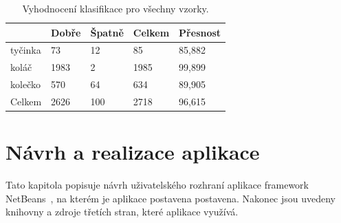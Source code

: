 \documentclass[11pt,twoside,a4paper,table]{book}
\begin{document}
\begin{table}[h]
\begin{center}
\begin{tabular}{lllll}
\rowcolor[HTML]{9B9B9B} 
\multicolumn{1}{|l|}{\cellcolor[HTML]{9B9B9B}Třída} & \multicolumn{1}{l|}{\cellcolor[HTML]{9B9B9B}Dobře} & \multicolumn{1}{l|}{\cellcolor[HTML]{9B9B9B}Špatně}  & \multicolumn{1}{l|}{\cellcolor[HTML]{9B9B9B}Celkem} & \multicolumn{1}{l|}{\cellcolor[HTML]{9B9B9B}Přesnost} \\ \hline
\multicolumn{1}{|l|}{tyčinka}                             & \multicolumn{1}{l|}{73}                            & \multicolumn{1}{l|}{12}                              & \multicolumn{1}{l|}{85}                             & \multicolumn{1}{l|}{85,882}                           \\ \hline
\multicolumn{1}{|l|}{koláč}                             & \multicolumn{1}{l|}{1983}                          & \multicolumn{1}{l|}{2}                               & \multicolumn{1}{l|}{1985}                           & \multicolumn{1}{l|}{99,899}                           \\ \hline
\multicolumn{1}{|l|}{kolečko}                             & \multicolumn{1}{l|}{570}                           & \multicolumn{1}{l|}{64}                              & \multicolumn{1}{l|}{634}                            & \multicolumn{1}{l|}{89,905}                           \\ \hline
Celkem                                              & 2626                                               & 100                                                  & 2718                                                & 96,615                                                \\ \hline
\end{tabular}
\end{center}
\caption{Vyhodnocení klasifikace pro všechny vzorky. }
\label{tab:classresult8}
\end{table}


\chapter{Návrh a realizace aplikace}

Tato kapitola popisuje návrh uživatelského rozhraní aplikace framework NetBeans~\cite{sw:nb_platform}, na kterém je aplikace postavena postavena. Nakonec jsou uvedeny knihovny a zdroje třetích stran, které aplikace využívá.
\end{document}
